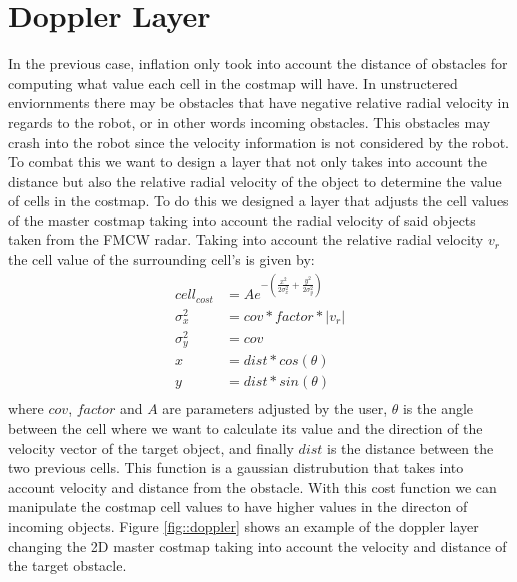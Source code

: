 \section{Doppler Layer}
In the previous case, inflation only took into account the distance of obstacles for computing what value each cell in the costmap will have. In unstructered enviornments there may be obstacles that have negative relative radial velocity in regards to the robot, or in other words incoming obstacles. This obstacles may crash into the robot since the velocity information is not considered by the robot. To combat this we  want to design a layer that not only takes into account the distance but also the relative radial velocity of the object to determine the value of cells in the costmap.  
To do this we designed a layer that adjusts the cell values of the master costmap taking into account the radial velocity of said objects taken from the \ac{FMCW} \ac{radar}. Taking into account the relative  radial velocity $v_r$ the cell value of the surrounding cell's is given by:
\begin{equation} \label{eq1}
\begin{split}
cell_{cost} & = A e^{-(\frac{x^2}{2 \sigma_x^2}+\frac{y^2}{2 \sigma_y^2})} \\
 \sigma_x^2 & = cov * factor * |v_r| \\
 \sigma_y^2 & = cov \\
 x & =dist *cos(\theta)\\
 y & =dist *sin(\theta)\\
\end{split}
\end{equation}
where $cov$, $factor$ and $A$ are parameters adjusted by the user, $\theta$ is the angle between the cell where we want to calculate its value and the direction of the velocity vector of the target object, and finally $dist$ is the distance between the two previous cells. This function is a gaussian distrubution that takes into account velocity and distance from the obstacle.
With this cost function we can manipulate the costmap cell values to have higher values in the directon of incoming objects. Figure \ref{fig::doppler} shows an example of the doppler layer changing the 2D master costmap taking into account the velocity and distance of the target obstacle. 

